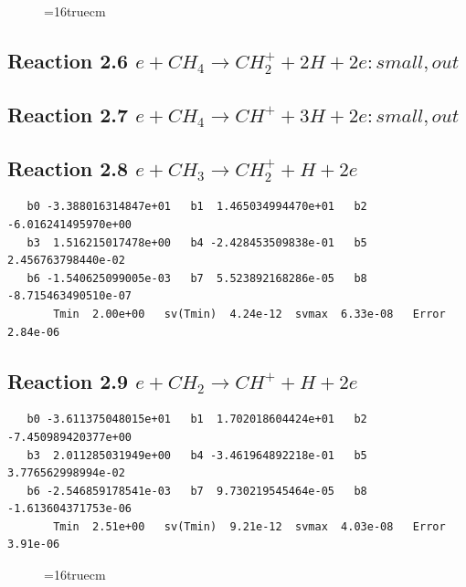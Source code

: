 \documentclass[12pt,dvipdfmx]{article}
\begin{document}
\begin{figure} \label{met.2_2.5}
\epsfxsize=16truecm
\end{figure}
\newpage
\subsection{
Reaction 2.6       $e + CH_4 \rightarrow CH_2^+ + 2H + 2e: small, out $
}
\subsection{
Reaction 2.7       $e + CH_4 \rightarrow CH^+ + 3H + 2e: small, out $
}
\subsection{
Reaction 2.8      $e + CH_3 \rightarrow CH_2^+ + H + 2e $
}

\begin{small}\begin{verbatim}
   b0 -3.388016314847e+01   b1  1.465034994470e+01   b2 -6.016241495970e+00
   b3  1.516215017478e+00   b4 -2.428453509838e-01   b5  2.456763798440e-02
   b6 -1.540625099005e-03   b7  5.523892168286e-05   b8 -8.715463490510e-07
       Tmin  2.00e+00   sv(Tmin)  4.24e-12  svmax  6.33e-08   Error  2.84e-06
\end{verbatim}\end{small}

\subsection{
Reaction 2.9      $e + CH_2 \rightarrow CH^+ + H + 2e $
}

\begin{small}\begin{verbatim}
   b0 -3.611375048015e+01   b1  1.702018604424e+01   b2 -7.450989420377e+00
   b3  2.011285031949e+00   b4 -3.461964892218e-01   b5  3.776562998994e-02
   b6 -2.546859178541e-03   b7  9.730219545464e-05   b8 -1.613604371753e-06
       Tmin  2.51e+00   sv(Tmin)  9.21e-12  svmax  4.03e-08   Error  3.91e-06
\end{verbatim}\end{small}

\begin{figure} \label{met.2_2.8}
\epsfxsize=16truecm
\end{figure}
\newpage
\end{document}
